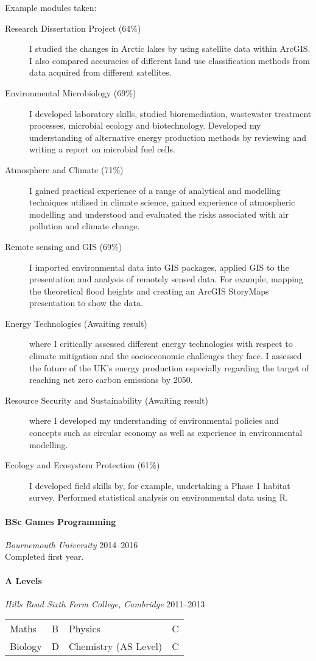 \documentclass[11pt,a4paper]{article}
\newcommand{\centry}[3]{\paragraph{#1} \textit{#2}%
\hfill#3\\[2pt]}
\begin{document}
Example modules taken:
\begin{description}
\item[Research Dissertation Project (64\%)] I studied the changes in Arctic
  lakes by using satellite data within ArcGIS. I also compared accuracies of
  different land use classification methods from data acquired from different
  satellites.  
\item[Environmental Microbiology (69\%)] I developed laboratory skills, studied
  bioremediation, wastewater treatment processes, microbial ecology and
  biotechnology. Developed my understanding of alternative energy production
  methods by reviewing and writing a report on microbial fuel cells.
\item[Atmosphere and Climate (71\%)]  I gained practical experience of a range of
  analytical and modelling techniques utilised in climate science, gained
  experience of atmospheric modelling and understood and evaluated the risks
  associated with air pollution and climate change.
\item[Remote sensing and GIS (69\%)] I imported environmental data into GIS
  packages, applied GIS to the presentation and analysis of remotely sensed
  data. For example, mapping the theoretical flood heights and creating an
  ArcGIS StoryMaps presentation to show the data.  
  \item[Energy Technologies (Awaiting result)] where I
  critically assessed different energy technologies with respect to climate
  mitigation and the socioeconomic challenges they face. I assessed the future
  of the UK’s energy production especially regarding the target of reaching net
  zero carbon emissions by 2050.  
  \item[Resource Security and Sustainability (Awaiting result)] where I
  developed my understanding of environmental policies and concepts such as
  circular economy as well as experience in environmental modelling. 
\item[Ecology and Ecosystem Protection (61\%)] I developed field skills by, for
  example, undertaking a Phase 1 habitat survey. Performed statistical analysis
  on environmental data using R.
\end{description}


\centry{BSc Games Programming}{Bournemouth University}{2014--2016}
Completed first year.

\centry{A Levels}{Hills Road Sixth Form College, Cambridge} {2011--2013}
\begin{center}
  \begin{tabular}{llll}
    Maths & B & Physics & C \\
    Biology & D  & Chemistry (AS Level) & C\\
  \end{tabular}
\end{center}
\end{document}
